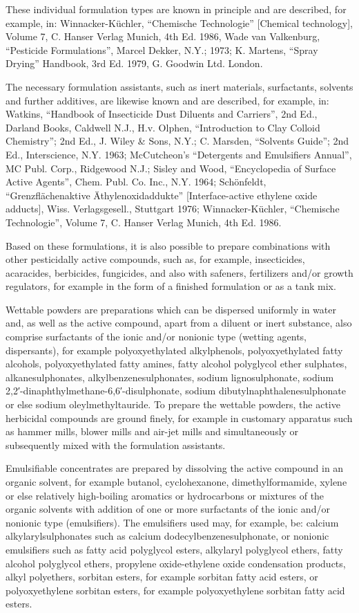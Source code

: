 \documentclass[11pt,a4paper]{article}
\begin{document}
These individual formulation types are known in principle and are described, for example, in: Winnacker-Küchler, “Chemische Technologie” [Chemical technology], Volume 7, C. Hanser Verlag Munich, 4th Ed. 1986, Wade van Valkenburg, “Pesticide Formulations”, Marcel Dekker, N.Y.; 1973; K. Martens, “Spray Drying” Handbook, 3rd Ed. 1979, G. Goodwin Ltd. London.

The necessary formulation assistants, such as inert materials, surfactants, solvents and further additives, are likewise known and are described, for example, in: Watkins, “Handbook of Insecticide Dust Diluents and Carriers”, 2nd Ed., Darland Books, Caldwell N.J., H.v. Olphen, “Introduction to Clay Colloid Chemistry”; 2nd Ed., J. Wiley \& Sons, N.Y.; C. Marsden, “Solvents Guide”; 2nd Ed., Interscience, N.Y. 1963; McCutcheon's “Detergents and Emulsifiers Annual”, MC Publ. Corp., Ridgewood N.J.; Sisley and Wood, “Encyclopedia of Surface Active Agents”, Chem. Publ. Co. Inc., N.Y. 1964; Schönfeldt, “Grenzflächenaktive Äthylenoxidaddukte” [Interface-active ethylene oxide adducts], Wiss. Verlagsgesell., Stuttgart 1976; Winnacker-Küchler, “Chemische Technologie”, Volume 7, C. Hanser Verlag Munich, 4th Ed. 1986.

Based on these formulations, it is also possible to prepare combinations with other pesticidally active compounds, such as, for example, insecticides, acaracides, berbicides, fungicides, and also with safeners, fertilizers and/or growth regulators, for example in the form of a finished formulation or as a tank mix.

Wettable powders are preparations which can be dispersed uniformly in water and, as well as the active compound, apart from a diluent or inert substance, also comprise surfactants of the ionic and/or nonionic type (wetting agents, dispersants), for example polyoxyethylated alkylphenols, polyoxyethylated fatty alcohols, polyoxyethylated fatty amines, fatty alcohol polyglycol ether sulphates, alkanesulphonates, alkylbenzenesulphonates, sodium lignosulphonate, sodium 2,2′-dinaphthylmethane-6,6′-disulphonate, sodium dibutylnaphthalenesulphonate or else sodium oleylmethyltauride. To prepare the wettable powders, the active herbicidal compounds are ground finely, for example in customary apparatus such as hammer mills, blower mills and air-jet mills and simultaneously or subsequently mixed with the formulation assistants.

Emulsifiable concentrates are prepared by dissolving the active compound in an organic solvent, for example butanol, cyclohexanone, dimethylformamide, xylene or else relatively high-boiling aromatics or hydrocarbons or mixtures of the organic solvents with addition of one or more surfactants of the ionic and/or nonionic type (emulsifiers). The emulsifiers used may, for example, be: calcium alkylarylsulphonates such as calcium dodecylbenzenesulphonate, or nonionic emulsifiers such as fatty acid polyglycol esters, alkylaryl polyglycol ethers, fatty alcohol polyglycol ethers, propylene oxide-ethylene oxide condensation products, alkyl polyethers, sorbitan esters, for example sorbitan fatty acid esters, or polyoxyethylene sorbitan esters, for example polyoxyethylene sorbitan fatty acid esters.
\end{document}
